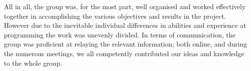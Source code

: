 All in all, the group was, for the most part, well organised and worked effectively together in accomplishing the various objectives and results in the project. However due to the inevitable individual differences in abilities and  experience at programming the work was unevenly divided. In terms of communication, the group was proficient at relaying the relevant information; both online, and during the numerous meetings, we all competently contributed our ideas and knowledge to the whole group.